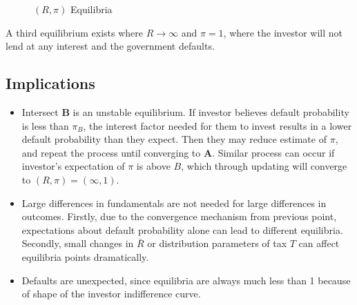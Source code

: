 \documentclass[main.tex]{subfiles}
\begin{document}
\begin{figure}[H]
            
            \caption{$(R, \pi)$ Equilibria}
            \label{fig:default-interest-eqm}
        \end{figure}
        
        A third equilibrium exists where $R \to \infty$ and $\pi = 1$, where the investor will not lend at any interest and the government defaults.
        
        \subsection*{Implications}
        \begin{itemize}
            
            \item
            Intersect \textbf{B} is an unstable equilibrium. If investor believes default probability is less than $\pi_B$, the interest factor needed for them to invest results in a lower default probability than they expect. Then they may reduce estimate of $\pi$, and repeat the process until converging to \textbf{A}. Similar process can occur if investor's expectation of $\pi$ is above $B$, which through updating will converge to $(R, \pi) = (\infty, 1)$.
            
            \item
            Large differences in fundamentals are not needed for large differences in outcomes. Firstly, due to the convergence mechanism from previous point, expectations about default probability alone can lead to different equilibria. Secondly, small changes in $\bar R$ or distribution parameters of tax $T$ can affect equilibria points dramatically.
            
            \item
            Defaults are unexpected, since equilibria are always much less than 1 because of shape of the investor indifference curve.
            
            
        \end{itemize}
        
        
        
    
\end{document}
